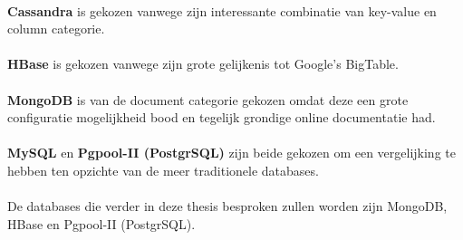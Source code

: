 \paragraph{} \textbf{Cassandra} is gekozen vanwege zijn interessante combinatie van key-value en column categorie. 

\paragraph{} \textbf{HBase} is gekozen vanwege zijn grote gelijkenis tot Google's BigTable.

\paragraph{} \textbf{MongoDB} is van de document categorie gekozen omdat deze een grote configuratie mogelijkheid bood en tegelijk grondige online documentatie had. 

\paragraph{} \textbf{MySQL} en \textbf{Pgpool-II (PostgrSQL)} zijn beide gekozen om een vergelijking te hebben ten opzichte van de meer traditionele databases. 

\paragraph{} De databases die verder in deze thesis besproken zullen worden zijn MongoDB, HBase en Pgpool-II (PostgrSQL). 